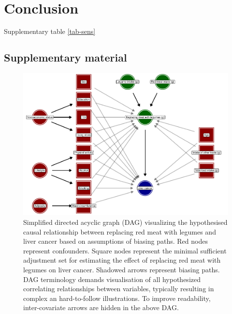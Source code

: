 \documentclass[sn-basic,Numbered,iicol,pdflatex]{sn-jnl}
\begin{document}
\hypertarget{sec5}{%
\section{Conclusion}\label{sec5}}

Supplementary table \ref{tab-sens}

\begin{appendices}

\renewcommand{\thetable}{S\arabic{table}} \renewcommand{\theHtable}{S\arabic{table}}
\renewcommand{\thefigure}{S\arabic{figure}} \renewcommand{\theHfigure}{S\arabic{figure}}

\clearpage

\hypertarget{secA1}{%
\section{Supplementary material}\label{secA1}}

\begin{figure}[h]

{\centering \includegraphics[width=1\linewidth,]{legliv_eur-j-nutr_files/figure-latex/fig2-1} 

}

\caption{Simplified directed acyclic graph (DAG) visualizing the hypothesised causal relationship between replacing red meat with legumes and liver cancer based on assumptions of biasing paths. Red nodes represent confounders. Square nodes represent the minimal sufficient adjustment set for estimating the effect of replacing red meat with legumes on liver cancer. Shadowed arrows represent biasing paths. DAG terminology demands visualisation of all hypothesized correlating relationships between variables, typically resulting in complex an hard-to-follow illustrations. To improve readability, inter-covariate arrows are hidden in the above DAG.}\label{fig:fig2}
\end{figure}


\end{appendices}
\end{document}
